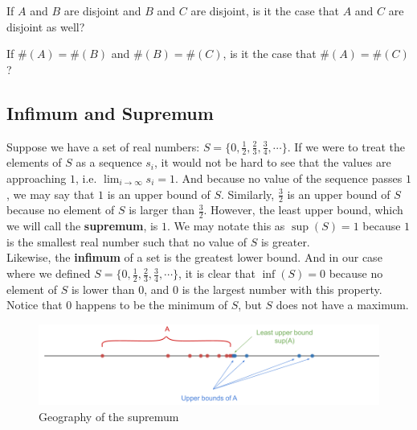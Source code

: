 \begin{exercise}
    If $A$ and $B$ are disjoint and $B$ and $C$ are disjoint, is it the case that $A$ and $C$ are disjoint as well?
\end{exercise}
    \vspace{-4mm}

\begin{exercise}
    If $\#(A)=\#(B)$ and $\#(B)=\#(C)$, is it the case that $\#(A)=\#(C)$?
\end{exercise}

\subsection{Infimum and Supremum}

Suppose we have a set of real numbers: $S=\{0,\frac{1}{2},\frac{2}{3},\frac{3}{4},\cdots\}$. If we were to treat the elements of $S$ as a sequence $s_i$, it would not be hard to see that the values are approaching $1$, i.e. $\lim_{i\to\infty}s_i=1$. And because no value of the sequence passes $1$, we may say that $1$ is an upper bound of $S$. Similarly, $\frac{3}{2}$ is an upper bound of $S$ because no element of $S$ is larger than $\frac{3}{2}$. However, the least upper bound, which we will call the \textbf{supremum}, is $1$. We may notate this as $\sup(S)=1$ because $1$ is the smallest real number such that no value of $S$ is greater. \\

Likewise, the \textbf{infimum} of a set is the greatest lower bound. And in our case where we defined $S=\{0,\frac{1}{2},\frac{2}{3},\frac{3}{4},\cdots\}$, it is clear that $\inf(S)=0$ because no element of $S$ is lower than $0$, and $0$ is the largest number with this property. Notice that $0$ happens to be the minimum of $S$, but $S$ does not have a maximum. 

  \begin{center}

\begin{figure}
    \includegraphics[width=1\textwidth]{Images/Chap0/0sup.png}
  \caption{Geography of the supremum}
\end{figure}
  \end{center}

